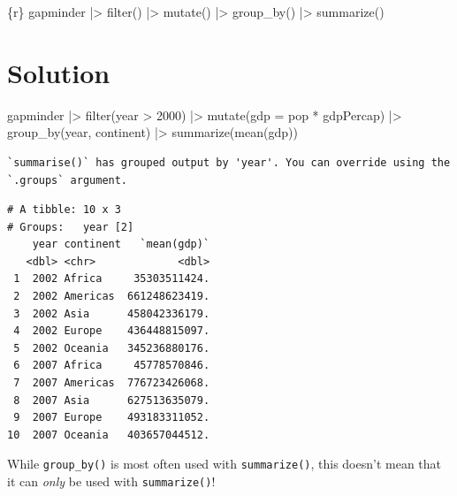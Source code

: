 \documentclass[
  letterpaper,
  DIV=11,
  numbers=noendperiod]{scrreprt}
\newenvironment{Shaded}{\begin{snugshade}}{\end{snugshade}}
\newcommand{\AttributeTok}[1]{\textcolor[rgb]{0.40,0.45,0.13}{#1}}
\newcommand{\DecValTok}[1]{\textcolor[rgb]{0.68,0.00,0.00}{#1}}
\newcommand{\FunctionTok}[1]{\textcolor[rgb]{0.28,0.35,0.67}{#1}}
\newcommand{\InformationTok}[1]{\textcolor[rgb]{0.37,0.37,0.37}{#1}}
\newcommand{\NormalTok}[1]{\textcolor[rgb]{0.00,0.23,0.31}{#1}}
\newcommand{\SpecialCharTok}[1]{\textcolor[rgb]{0.37,0.37,0.37}{#1}}
\begin{document}
\begin{Shaded}
\begin{Highlighting}[]
\InformationTok{\textasciigrave{}\textasciigrave{}\textasciigrave{}\{r\}}
\InformationTok{gapminder |\textgreater{}}
\InformationTok{  filter() |\textgreater{}}
\InformationTok{  mutate() |\textgreater{}}
\InformationTok{  group\_by() |\textgreater{}}
\InformationTok{  summarize()}
\InformationTok{\textasciigrave{}\textasciigrave{}\textasciigrave{}}
\end{Highlighting}
\end{Shaded}

\section{Solution}

\begin{Shaded}
\begin{Highlighting}[]
\NormalTok{gapminder }\SpecialCharTok{|\textgreater{}}
  \FunctionTok{filter}\NormalTok{(year }\SpecialCharTok{\textgreater{}} \DecValTok{2000}\NormalTok{) }\SpecialCharTok{|\textgreater{}}
  \FunctionTok{mutate}\NormalTok{(}\AttributeTok{gdp =}\NormalTok{ pop }\SpecialCharTok{*}\NormalTok{ gdpPercap) }\SpecialCharTok{|\textgreater{}}
  \FunctionTok{group\_by}\NormalTok{(year, continent) }\SpecialCharTok{|\textgreater{}}
  \FunctionTok{summarize}\NormalTok{(}\FunctionTok{mean}\NormalTok{(gdp))}
\end{Highlighting}
\end{Shaded}

\begin{verbatim}
`summarise()` has grouped output by 'year'. You can override using the
`.groups` argument.
\end{verbatim}

\begin{verbatim}
# A tibble: 10 x 3
# Groups:   year [2]
    year continent   `mean(gdp)`
   <dbl> <chr>             <dbl>
 1  2002 Africa     35303511424.
 2  2002 Americas  661248623419.
 3  2002 Asia      458042336179.
 4  2002 Europe    436448815097.
 5  2002 Oceania   345236880176.
 6  2007 Africa     45778570846.
 7  2007 Americas  776723426068.
 8  2007 Asia      627513635079.
 9  2007 Europe    493183311052.
10  2007 Oceania   403657044512.
\end{verbatim}

While \texttt{group\_by()} is most often used with \texttt{summarize()},
this doesn't mean that it can \emph{only} be used with
\texttt{summarize()}!
\end{document}
